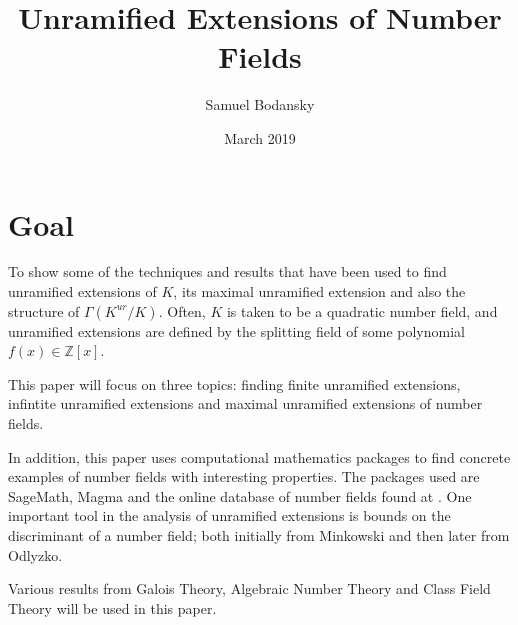 \documentclass[12pt]{extarticle}
\title{Unramified Extensions of Number Fields}
\author{Samuel Bodansky}
\date{March 2019}
\newcommand{\Z}{\mathbb{Z}}
\newcommand{\<}{\langle}
\renewcommand{\>}{\rangle}
\theoremstyle{definition}
\begin{document}
\maketitle
\section{Goal}
To show some of the techniques and results that have been used  to find unramified extensions of $K$, its maximal unramified extension and also the structure of $\Gamma(K^{ur}/K)$. Often, $K$ is taken to be a quadratic number field, and unramified extensions are defined by the splitting field of some polynomial $f(x) \in \Z[x]$. \par
This paper will focus on three topics: finding finite unramified extensions, infintite unramified extensions and maximal unramified extensions of number fields. \par
In addition, this paper uses computational mathematics packages to find concrete examples of number fields with interesting properties. The packages used are SageMath, Magma and the online database of number fields found at \cite{JONE2}.
 One important tool in the analysis of unramified extensions is bounds on the discriminant of a number field; both initially from Minkowski and then later from Odlyzko. \par
 Various results from Galois Theory, Algebraic Number Theory and Class Field Theory will be used in this paper. 
\end{document}
